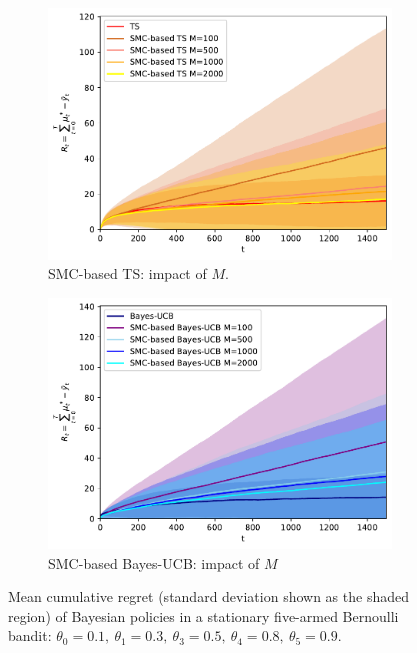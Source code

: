 \begin{figure}[!h]
	\begin{subfigure}[b]{0.46\textwidth}
		\centering
		\includegraphics[width=\textwidth]{./fods_figs/static/bernoulli/A5/theta0.1_0.3_0.5_0.8_0.9_allM_cumulative_regret_ts}
		\caption{SMC-based TS: impact of $M$.}
	\end{subfigure}
	\begin{subfigure}[b]{0.46\textwidth}
		\centering
		\includegraphics[width=\textwidth]{./fods_figs/static/bernoulli/A5/theta0.1_0.3_0.5_0.8_0.9_allM_cumulative_regret_bucb}
		\caption{SMC-based Bayes-UCB: impact of $M$}
	\end{subfigure}
	
	\caption{Mean cumulative regret (standard deviation shown as the shaded region) of Bayesian policies in a stationary five-armed Bernoulli bandit:
		$\theta_0=0.1, \ \theta_1=0.3, \ \theta_3=0.5, \ \theta_4=0.8, \ \theta_5=0.9$.
	}
\end{figure}

